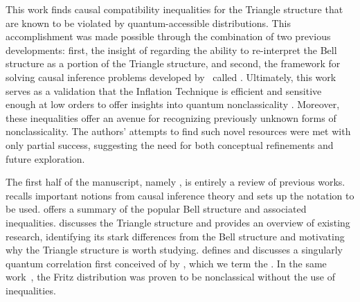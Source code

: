 \documentclass[aps, 10pt, english, twoside, pra, nofootinbib, tightenlines, longbibliography, superscriptaddress]{revtex4-1}
\begin{document}
    This work finds causal compatibility inequalities for the Triangle structure that are known to be violated by quantum-accessible distributions. This accomplishment was made possible through the combination of two previous developments: first, the insight of \citet{Fritz_2012} regarding the ability to re-interpret the Bell structure as a portion of the Triangle structure, and second, the framework for solving causal inference problems developed by~\citet{Inflation} called . Ultimately, this work serves as a validation that the Inflation Technique is efficient and sensitive enough at low orders to offer insights into quantum nonclassicality \cite{Navascues_2017}. Moreover, these inequalities offer an avenue for recognizing previously unknown forms of nonclassicality. The authors' attempts to find such novel resources were met with only partial success, suggesting the need for both conceptual refinements and future exploration.

    The first half of the manuscript, namely , is entirely a review of previous works.  recalls important notions from causal inference theory and sets up the notation to be used.  offers a summary of the popular Bell structure and associated inequalities.  discusses the Triangle structure and provides an overview of existing research, identifying its stark differences from the Bell structure and motivating why the Triangle structure is worth studying.  defines and discusses a singularly quantum correlation first conceived of by \citet{Fritz_2012}, which we term the . In the same work~\cite{Fritz_2012}, the Fritz distribution was proven to be nonclassical without the use of inequalities.
\end{document}
